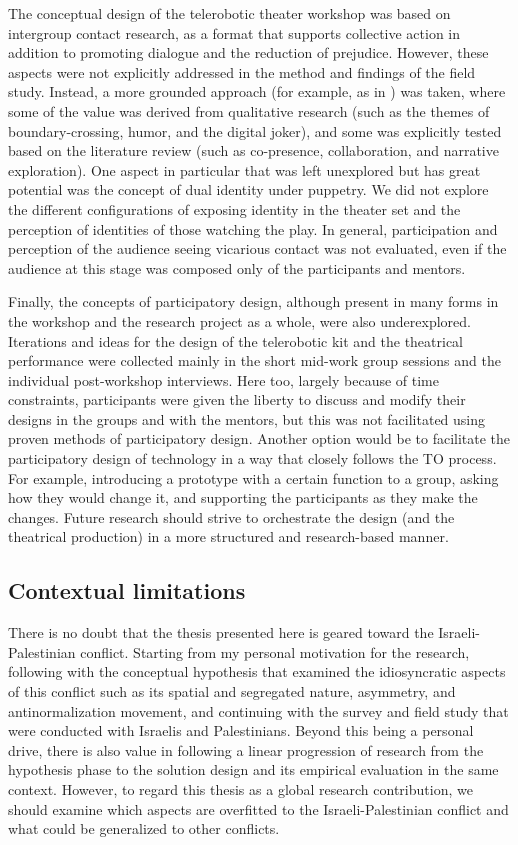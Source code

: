 \documentclass[dissertation,math,vertlayout,pdfa,colorlinks]{aaltoseries}
\begin{document}
The conceptual design of the telerobotic theater workshop was based on intergroup contact research, as a format that supports collective action in addition to promoting dialogue and the reduction of prejudice. However, these aspects were not explicitly addressed in the method and findings of the field study. Instead, a more grounded approach (for example, as in \cite{glaserBasicsGroundedTheory1992}) was taken, where some of the value was derived from qualitative research (such as the themes of boundary-crossing, humor, and the digital joker), and some was explicitly tested based on the literature review (such as co-presence, collaboration, and narrative exploration). One aspect in particular that was left unexplored but has great potential was the concept of dual identity under puppetry. We did not explore the different configurations of exposing identity in the theater set and the perception of identities of those watching the play. In general, participation and perception of the audience seeing vicarious contact was not evaluated, even if the audience at this stage was composed only of the participants and mentors.

Finally, the concepts of participatory design, although present in many forms in the workshop and the research project as a whole, were also underexplored. Iterations and ideas for the design of the telerobotic kit and the theatrical performance were collected mainly in the short mid-work group sessions and the individual post-workshop interviews. Here too, largely because of time constraints, participants were given the liberty to discuss and modify their designs in the groups and with the mentors, but this was not facilitated using proven methods of participatory design. Another option would be to facilitate the participatory design of technology in a way that closely follows the TO process. For example, introducing a prototype with a certain function to a group, asking how they would change it, and supporting the participants as they make the changes. Future research should strive to orchestrate the design (and the theatrical production) in a more structured and research-based manner.


\subsection{Contextual limitations}
There is no doubt that the thesis presented here is geared toward the Israeli-Palestinian conflict. Starting from my personal motivation for the research, following with the conceptual hypothesis that examined the idiosyncratic aspects of this conflict such as its spatial and segregated nature, asymmetry, and antinormalization movement, and continuing with the survey and field study that were conducted with Israelis and Palestinians. Beyond this being a personal drive, there is also value in following a linear progression of research from the hypothesis phase to the solution design and its empirical evaluation in the same context. However, to regard this thesis as a global research contribution, we should examine which aspects are overfitted to the Israeli-Palestinian conflict and what could be generalized to other conflicts.
\end{document}
